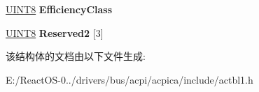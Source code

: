 \begin{DoxyCompactItemize}
\item 
\mbox{\label{structacpi__madt__generic__interrupt_a7664b5584ef79c64ad89eecd46a6ccef}} 
\hyperlink{_processor_bind_8h_ab27e9918b538ce9d8ca692479b375b6a}{U\+I\+N\+T8} {\bfseries Efficiency\+Class}
\item 
\mbox{\label{structacpi__madt__generic__interrupt_a17e78fa22227c810f93e418f01391b74}} 
\hyperlink{_processor_bind_8h_ab27e9918b538ce9d8ca692479b375b6a}{U\+I\+N\+T8} {\bfseries Reserved2} \mbox{[}3\mbox{]}
\end{DoxyCompactItemize}


该结构体的文档由以下文件生成\+:\begin{DoxyCompactItemize}
\item 
E\+:/\+React\+O\+S-\/0../drivers/bus/acpi/acpica/include/actbl1.\+h\end{DoxyCompactItemize}
